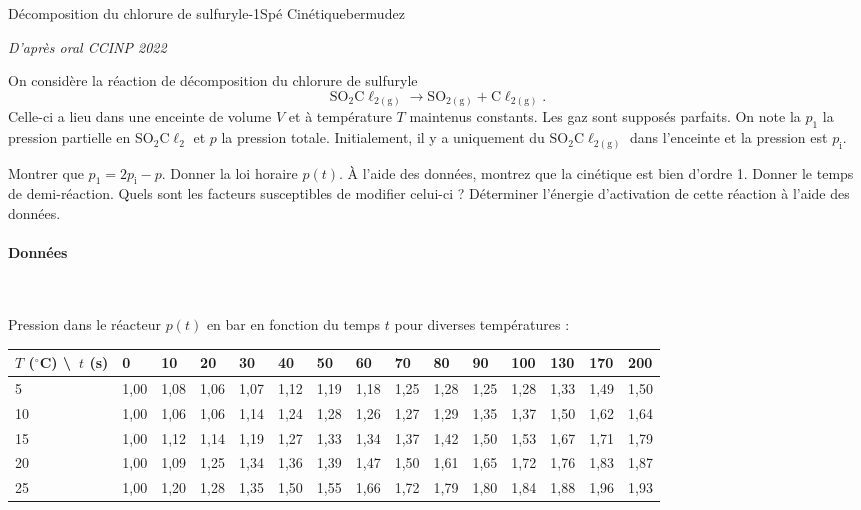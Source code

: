 \begin{exercise}{Décomposition du chlorure de sulfuryle}{-1}{Spé}
{Cinétique}{bermudez}

\begin{flushright}
\noindent\textsl{D'après oral CCINP 2022}
\end{flushright}

On considère la réaction de décomposition du chlorure de sulfuryle
$$\mathrm{SO_2C\ell_{2(g)} \longrightarrow SO_{2(g)} + C\ell_{2(g)}}.$$
Celle-ci a lieu dans une enceinte de volume $V$ et à température $T$ maintenus constants. Les gaz sont supposés parfaits. On note la $p_1$ la pression partielle en SO$_2$C$\ell_2$ et $p$ la pression totale. Initialement, il y a uniquement du $\mathrm{SO_2C\ell_{2(g)}}$ dans l'enceinte et la pression est $p_\text{i}$.

\begin{questions}
    \question Montrer que $p_1 = 2p_\text{i} - p$.
    \question Donner la loi horaire $p(t)$.
    \question \`A l'aide des données, montrez que la cinétique est bien d'ordre 1.
    \question Donner le temps de demi-réaction. Quels sont les facteurs susceptibles de modifier celui-ci ?
    \question Déterminer l'énergie d'activation de cette réaction à l'aide des données.
\end{questions}

\paragraph{Données}~

Pression dans le réacteur $p(t)$ en bar en fonction du temps $t$ pour diverses températures :\\[-2.7em]
\begin{center}
\begin{tabular}{l|llllllllllllll}
\hline
$T$ ($^\circ$C) \textbackslash\  $t$ (s) & 0    & 10   & 20   & 30   & 40   & 50   & 60   & 70   & 80   & 90   & 100  & 130  & 170  & 200  \\ \hline
5                           & 1,00 & 1,08 & 1,06 & 1,07 & 1,12 & 1,19 & 1,18 & 1,25 & 1,28 & 1,25 & 1,28 & 1,33 & 1,49 & 1,50 \\
10                          & 1,00 & 1,06 & 1,06 & 1,14 & 1,24 & 1,28 & 1,26 & 1,27 & 1,29 & 1,35 & 1,37 & 1,50 & 1,62 & 1,64 \\
15                          & 1,00 & 1,12 & 1,14 & 1,19 & 1,27 & 1,33 & 1,34 & 1,37 & 1,42 & 1,50 & 1,53 & 1,67 & 1,71 & 1,79 \\
20                          & 1,00 & 1,09 & 1,25 & 1,34 & 1,36 & 1,39 & 1,47 & 1,50 & 1,61 & 1,65 & 1,72 & 1,76 & 1,83 & 1,87 \\
25                          & 1,00 & 1,20 & 1,28 & 1,35 & 1,50 & 1,55 & 1,66 & 1,72 & 1,79 & 1,80 & 1,84 & 1,88 & 1,96 & 1,93 \\\hline\hline
\end{tabular}
\end{center}
\end{exercise}

